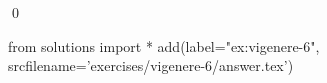 
\begin{ex} 
  \label{ex:vigenere-6}
  
  \qed
\end{ex} 
\begin{python0}
from solutions import *
add(label="ex:vigenere-6",
    srcfilename='exercises/vigenere-6/answer.tex') 
\end{python0}
